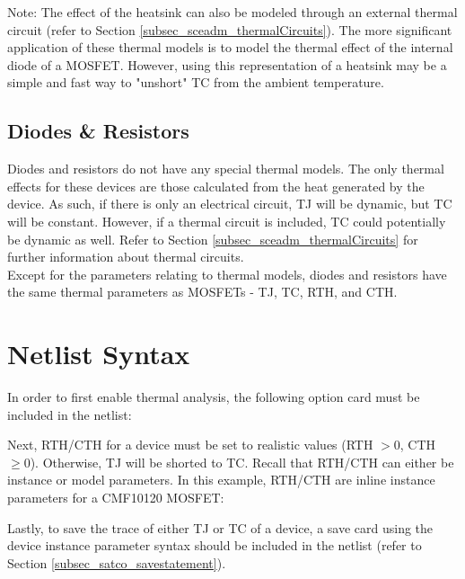 Note: The effect of the heatsink can also be modeled through an external thermal circuit (refer to Section \ref{subsec_sceadm_thermalCircuits}). The more significant application of these thermal models is to model the thermal effect of the internal diode of a MOSFET. However, using this representation of a heatsink may be a simple and fast way to "unshort" TC from the ambient temperature.

\subsection{Diodes \& Resistors}
\label{subsec_sceadm_thermalDioAndRes}

Diodes and resistors do not have any special thermal models. The only thermal effects for these devices are those calculated from the heat generated by the device. As such, if there is only an electrical circuit, TJ will be dynamic, but TC will be constant. However, if a thermal circuit is included, TC could potentially be dynamic as well. Refer to Section \ref{subsec_sceadm_thermalCircuits} for further information about thermal circuits. \\

Except for the parameters relating to thermal models, diodes and resistors have the same thermal parameters as MOSFETs - TJ, TC, RTH, and CTH.

\section{Netlist Syntax}
\label{subsec_sceadm_thermalnetsyntax}

In order to first enable thermal analysis, the following option card must be included in the netlist:


Next, RTH/CTH for a device must be set to realistic values (RTH $> 0$, CTH $\geq 0$). Otherwise, TJ will be shorted to TC. Recall that RTH/CTH can either be instance or model parameters. In this example, RTH/CTH are inline instance parameters for a CMF10120 MOSFET:


Lastly, to save the trace of either TJ or TC of a device, a save card using the device instance parameter syntax should be included in the netlist (refer to Section \ref{subsec_satco_savestatement}).


